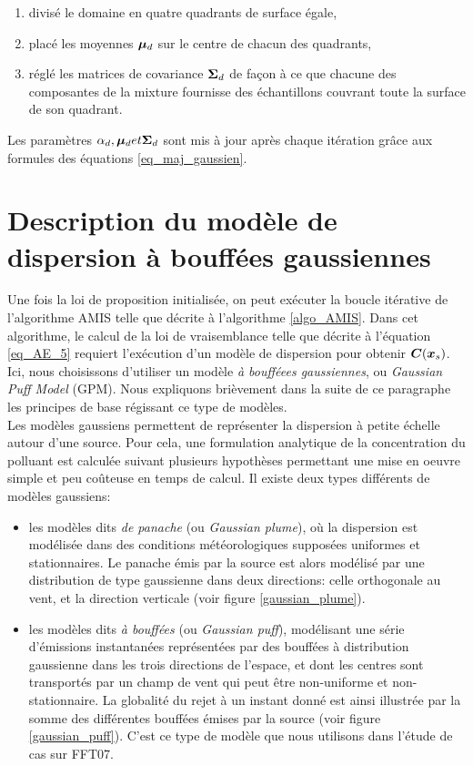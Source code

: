  \begin{enumerate}
  	\item divisé le domaine en quatre quadrants de surface égale, 
  	\item  placé les moyennes ${\bm{\mu}}_d$ sur le centre de chacun des quadrants,
  	\item réglé les matrices de covariance ${\bm{\Sigma}}_d$ de façon à ce que chacune des composantes de la mixture fournisse des échantillons couvrant toute la surface de son quadrant.\\
  \end{enumerate}
  
  Les paramètres $\alpha_d, {\bm{\mu}}_d et {\bm{\Sigma}}_d$ sont mis à jour après chaque itération grâce aux formules des équations \eqref{eq_maj_gaussien}.\\


\section{Description du modèle de dispersion à bouffées gaussiennes}

Une fois la loi de proposition initialisée, on peut exécuter la boucle itérative de l'algorithme AMIS telle que décrite à l'algorithme \ref{algo_AMIS}. Dans cet algorithme, le calcul de la loi de vraisemblance telle que décrite à l'équation \eqref{eq_AE_5} requiert l'exécution d'un modèle de dispersion pour obtenir ${\bm{C}}({\bm{x}_s})$. Ici, nous choisissons d'utiliser un modèle \textit{à boufféees gaussiennes}, ou \textit{Gaussian Puff Model} (GPM). Nous expliquons brièvement dans la suite de ce paragraphe les principes de base régissant ce type de modèles.\\

Les modèles gaussiens permettent de représenter la dispersion à petite échelle autour d'une source. Pour cela, une formulation analytique de la concentration du polluant est calculée suivant plusieurs hypothèses permettant une mise en oeuvre simple et peu coûteuse en temps de calcul. Il existe deux types différents de modèles gaussiens:\\

\begin{itemize}
	\item les modèles dits \textit{de panache} (ou \textit{Gaussian plume}), où la dispersion est modélisée dans des conditions météorologiques supposées uniformes et stationnaires. Le panache émis par la source est alors modélisé par une distribution de type gaussienne dans deux directions: celle orthogonale au vent, et la direction verticale (voir figure \ref{gaussian_plume}).
	\item les modèles dits \textit{à bouffées} (ou \textit{Gaussian puff}), modélisant une série d'émissions instantanées représentées par des bouffées à distribution gaussienne dans les trois directions de l'espace, et dont les centres sont transportés par un champ de vent qui peut  être non-uniforme et non-stationnaire. La globalité du rejet à un instant donné est ainsi illustrée par la somme des différentes bouffées émises par la source (voir figure \ref{gaussian_puff}). C'est ce type de modèle que nous utilisons dans l'étude de cas sur FFT07.
\end{itemize}

